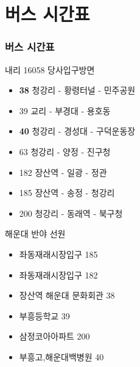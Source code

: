 \documentclass[aspectratio=1610,20pt,xcolor=pdftex,dvipsnames,table,handout]{beamer}
\begin{document}
		\section{버스 시간표}
		\begin{frame} [t,plain]
		\frametitle{버스 시간표}


			\begin{block} {내리 16058 당사입구방면 }
			\setlength{\leftmargini}{1em}			
			\begin{itemize}
				\item \textbf{38} 	\hfill 	청강리 - 황령터널 - 민주공원
				\item 39  			\hfill 	교리 - 부경대 - 용호동
				\item \textbf{40} 	\hfill 	청강리 - 경성대 - 구덕운동장
				\item 63 			\hfill 	청강리 - 양정 - 진구청
				\item 182 			\hfill 	장산역 - 일광 - 정관
				\item 185 			\hfill 	장산역 - 송정 - 청강리 
				\item 200			\hfill 	청강리 - 동래역 - 북구청
			\end{itemize}
			\end{block}						

			\begin{block} {해운대 반야 선원}
			\setlength{\leftmargini}{1em}			
			\begin{itemize}
				\item 좌동재래시장입구 		\hfill	185
				\item 좌동재래시장입구 		\hfill	182
				\item 장산역 해운대 문화회관 	\hfill	38
				\item 부흥등학교 			\hfill	 39
				\item 삼정코아아파트 			\hfill 	200
				\item 부흥고,해운대백병원 	\hfill 	40
			\end{itemize}
			\end{block}						


		\end{frame}						

\end{document}
